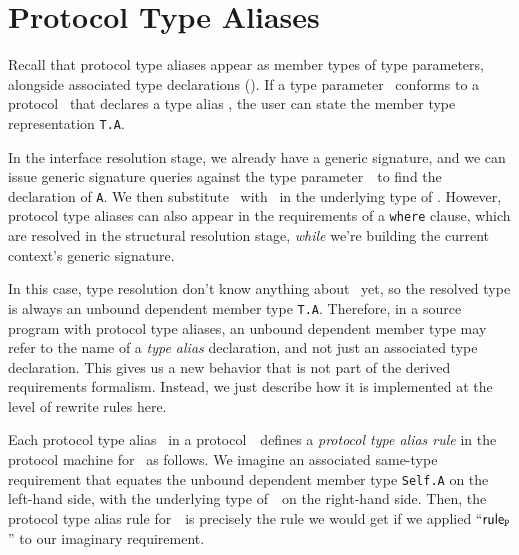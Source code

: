 \documentclass[../generics]{subfiles}
\begin{document}
\section{Protocol Type Aliases}\label{protocol type aliases}

Recall that protocol type aliases appear as member types of type parameters, alongside associated type declarations (). If a type parameter \tT\ conforms to a protocol \tP\ that declares a type alias \nA, the user can state the member type representation \texttt{T.A}.

In the interface resolution stage, we already have a generic signature, and we can issue generic signature queries against the type parameter~\tT\ to find the declaration of \texttt{A}. We then substitute \tSelf\ with \tT\ in the underlying type of \nA. However, protocol type aliases can also appear in the requirements of a \texttt{where} clause, which are resolved in the structural resolution stage, \emph{while} we're building the current context's generic signature.

In this case, type resolution don't know anything about \tT\ yet, so the resolved type is always an unbound dependent member type \texttt{T.A}. Therefore, in a source program with protocol type aliases, an unbound dependent member type may refer to the name of a \emph{type alias} declaration, and not just an associated type declaration. This gives us a new behavior that is not part of the derived requirements formalism. Instead, we just describe how it is implemented at the level of rewrite rules here.

Each protocol type alias \nA\ in a protocol~\tP\ defines a \emph{protocol type alias rule} in the protocol machine for \tP\ as follows. We imagine an associated same-type requirement that equates the unbound dependent member type \texttt{Self.A} on the left-hand side, with the underlying type of~\nA\  on the right-hand side. Then, the protocol type alias rule for~\nA\ is precisely the rule we would get if we applied ``$\mathsf{rule}_{\texttt{P}}$'' to our imaginary requirement.
\end{document}
